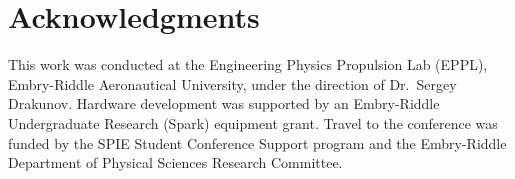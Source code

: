 \documentclass[11pt,letterpaper]{article}
\begin{document}
\section*{Acknowledgments}
This work was conducted at the Engineering Physics Propulsion Lab (EPPL), Embry-Riddle Aeronautical University, under the direction of Dr.\ Sergey Drakunov.  Hardware development was supported by an Embry-Riddle Undergraduate Research (Spark) equipment grant.  Travel to the conference was funded by the SPIE Student Conference Support program and the Embry-Riddle Department of Physical Sciences Research Committee.



\end{document}
